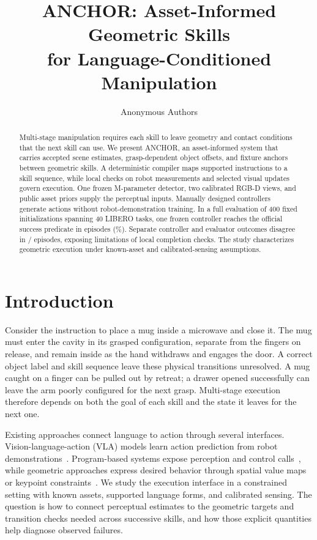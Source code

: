 \documentclass[letterpaper,10pt,conference]{ieeeconf}
\title{\LARGE\bf ANCHOR: Asset-Informed Geometric Skills\\
for Language-Conditioned Manipulation}
\author{Anonymous Authors}
\newcommand{\method}{ANCHOR}
\begin{document}
\maketitle
\thispagestyle{empty}
\pagestyle{empty}

\begin{abstract}
Multi-stage manipulation requires each skill to leave geometry and contact
conditions that the next skill can use. We present \method{}, an
asset-informed system that carries accepted scene estimates, grasp-dependent
object offsets, and fixture anchors between geometric skills. A deterministic
compiler maps supported instructions to a skill sequence, while local checks
on robot measurements and selected visual updates govern execution.
One frozen \NeuralMillion{}M-parameter detector, two calibrated RGB-D views,
and public asset priors supply the perceptual inputs. Manually designed
controllers generate actions without robot-demonstration training.
In a full evaluation of 400 fixed initializations spanning 40 LIBERO tasks,
one frozen controller reaches the official success predicate in
\SuccessCount{} episodes (\SuccessRate{}\%). Separate controller and evaluator
outcomes disagree in \DisagreementCount/\EpisodeCount{} episodes, exposing
limitations of local completion checks. The study characterizes geometric
execution under known-asset and calibrated-sensing assumptions.
\end{abstract}

\section{Introduction}
Consider the instruction to place a mug inside a microwave and close it.
The mug must enter the cavity in its grasped configuration, separate from the
fingers on release, and remain inside as the hand withdraws and engages the
door. A correct object label and skill sequence leave these physical
transitions unresolved. A mug caught on a finger can be pulled out by retreat;
a drawer opened successfully can leave the arm poorly configured for the
next grasp. Multi-stage execution therefore depends on both the goal of each
skill and the state it leaves for the next one.

Existing approaches connect language to action through several interfaces.
Vision-language-action (VLA) models learn action prediction from robot
demonstrations~\cite{openvla,smolvla,openvlaoft}. Program-based systems expose
perception and control calls~\cite{codepolicies}, while geometric approaches
express desired behavior through spatial value maps or keypoint
constraints~\cite{voxposer,rekep}. We study the execution interface in a
constrained setting with known assets, supported language forms, and
calibrated sensing. The question is how to connect perceptual estimates to
the geometric targets and transition checks needed across successive skills,
and how those explicit quantities help diagnose observed failures.
\end{document}

